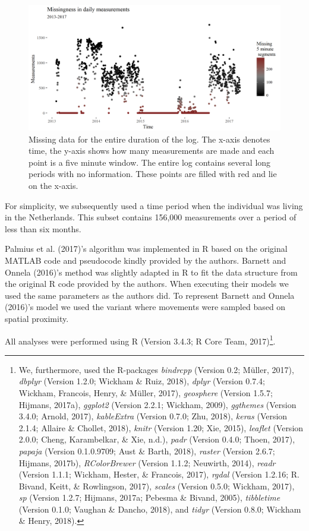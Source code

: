 \documentclass[man]{apa6}
\theoremstyle{definition}
\theoremstyle{definition}
\theoremstyle{definition}
\theoremstyle{remark}
\begin{document}
\begin{figure}
\includegraphics[width=1\linewidth]{img/missingdayBoaz5min} \caption{Missing data for the entire duration of the log. The x-axis denotes time, the y-axis shows how many measurements are made and each point is a five minute window. The entire log contains several long periods with no information. These points are filled with red and lie on the x-axis.}\label{fig:measurementsPerDay}
\end{figure}

For simplicity, we subsequently used a time period when the individual
was living in the Netherlands. This subset contains 156,000 measurements
over a period of less than six months.

Palmius et al. (2017)'s algorithm was implemented in R based on the
original MATLAB code and pseudocode kindly provided by the authors.
Barnett and Onnela (2016)'s method was slightly adapted in R to fit the
data structure from the original R code provided by the authors. When
executing their models we used the same parameters as the authors did.
To represent Barnett and Onnela (2016)'s model we used the variant where
movements were sampled based on spatial proximity.

All analyses were performed using R (Version 3.4.3; R Core Team,
2017)\footnote{We, furthermore, used the R-packages \emph{bindrcpp}
  (Version 0.2; Müller, 2017), \emph{dbplyr} (Version 1.2.0; Wickham \&
  Ruiz, 2018), \emph{dplyr} (Version 0.7.4; Wickham, Francois, Henry, \&
  Müller, 2017), \emph{geosphere} (Version 1.5.7; Hijmans, 2017a),
  \emph{ggplot2} (Version 2.2.1; Wickham, 2009), \emph{ggthemes}
  (Version 3.4.0; Arnold, 2017), \emph{kableExtra} (Version 0.7.0; Zhu,
  2018), \emph{keras} (Version 2.1.4; Allaire \& Chollet, 2018),
  \emph{knitr} (Version 1.20; Xie, 2015), \emph{leaflet} (Version 2.0.0;
  Cheng, Karambelkar, \& Xie, n.d.), \emph{padr} (Version 0.4.0; Thoen,
  2017), \emph{papaja} (Version 0.1.0.9709; Aust \& Barth, 2018),
  \emph{raster} (Version 2.6.7; Hijmans, 2017b), \emph{RColorBrewer}
  (Version 1.1.2; Neuwirth, 2014), \emph{readr} (Version 1.1.1; Wickham,
  Hester, \& Francois, 2017), \emph{rgdal} (Version 1.2.16; R. Bivand,
  Keitt, \& Rowlingson, 2017), \emph{scales} (Version 0.5.0; Wickham,
  2017), \emph{sp} (Version 1.2.7; Hijmans, 2017a; Pebesma \& Bivand,
  2005), \emph{tibbletime} (Version 0.1.0; Vaughan \& Dancho, 2018), and
  \emph{tidyr} (Version 0.8.0; Wickham \& Henry, 2018).}.
\end{document}
